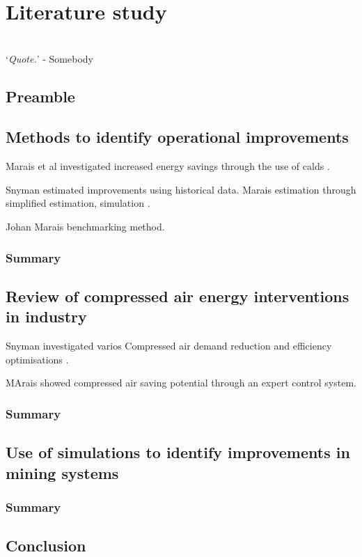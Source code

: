 \chapter{Literature study}
\vspace{38em}

\hrulefill
\\
\enquote*{\textit{Quote.}} - Somebody\\
\newpage
\section{Preamble}
\section{Methods to identify operational improvements}
Marais et al investigated increased energy savings through the use of \gls{calds} \cite{marais2009increased}.
\par
Snyman estimated improvements using historical data.\cite{Snyman2011Masters}
Marais estimation through simplified estimation, simulation \cite{Marais2012PhD, marais2013simplification}.
\par
Johan Marais benchmarking method. 

	\subsection{Summary}
\section{Review of compressed air energy interventions in industry}
Snyman investigated varios Compressed air demand reduction and efficiency optimisations \cite{Snyman2011Masters}.
\par
MArais showed compressed air saving potential through an expert control system.\cite{marais2010expert}
\par 

	\subsection{Summary}
\section{Use of simulations to identify improvements in mining systems}

	\subsection{Summary}
\section{Conclusion}